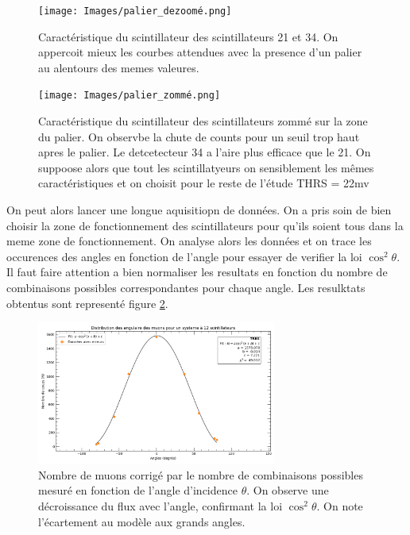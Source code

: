 \documentclass[a4paper,12pt,twoside]{article}
\begin{document}
\begin{figure}[H]
  \begin{minipage}
  {0.45\textwidth}
    \centering
    \texttt{[image: Images/palier\_dezoomé.png]}
    \caption{Caractéristique du scintillateur des scintillateurs 21 et 34. On appercoit mieux les courbes attendues avec la presence d'un palier au alentours des memes valeures.}
    \label{fig:caracteristique_scintillateur_1}
  \end{minipage}
  \hfill
  \begin{minipage}{0.45\textwidth}
    \centering
    \texttt{[image: Images/palier\_zommé.png]}
    \caption{Caractéristique du scintillateur des scintillateurs zommé sur la zone du palier. On observbe la chute de counts pour un seuil trop haut apres le palier. Le detcetecteur 34 a l'aire plus efficace que le 21. On suppoose alors que tout les scintillatyeurs on sensiblement les mêmes caractéristiques et on choisit pour le reste de l'étude THRS = 22mv}
    \label{fig:caracteristique_scintillateur_2}
  \end{minipage}
\end{figure}

On peut alors lancer une longue aquisitiopn de données. 
On a pris soin de bien choisir la zone de fonctionnement des scintillateurs pour qu'ils soient tous dans la meme zone de fonctionnement. 
On analyse alors les données et on trace les occurences des angles en fonction de l'angle pour essayer de verifier la loi $\cos^2\theta$.
Il faut faire attention a bien normaliser les resultats en fonction du nombre de combinaisons possibles correspondantes pour chaque angle.
Les resulktats obtentus sont representé figure \ref{fig:cos2s_2}.

\begin{figure}[H]
  \centering
  \includegraphics[width=0.7\textwidth]{Images/distribution_angulaire.png}
  \caption{Nombre de muons corrigé par le nombre de combinaisons possibles mesuré en fonction de l'angle d'incidence $\theta$. On observe une décroissance du flux avec l'angle, confirmant la loi $\cos^2\theta$. On note l'écartement au modèle aux grands angles.}
  \label{fig:cos2s_2}
\end{figure}
\end{document}
